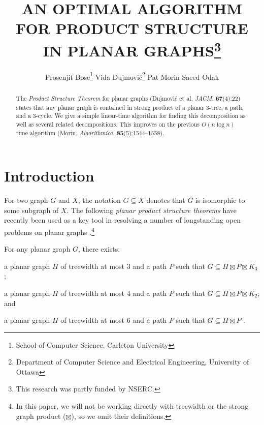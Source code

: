 \documentclass{patmorin}
\title{\MakeUppercase{An Optimal Algorithm for Product Structure in Planar Graphs}\thanks{This research was partly funded by NSERC.}}
\author{%
  Prosenjit Bose\thanks{School of Computer Science, Carleton University}\qquad
  Vida Dujmović\thanks{Department of Computer Science and Electrical Engineering, University of Ottawa}\qquad
  Pat Morin\footnotemark[1]\qquad
  Saeed Odak\footnotemark[2]}
\date{}
\begin{document}
\maketitle

\begin{abstract}
  The \emph{Product Structure Theorem} for planar graphs (Dujmović et al, \emph{JACM}, \textbf{67}(4):22) states that any planar graph is contained in strong product of a planar $3$-tree, a path, and a $3$-cycle.  We give a simple linear-time algorithm for finding this decomposition as well as several related decompositions.  This improves on the previous $O(n\log n)$ time algorithm (Morin, \emph{Algorithmica}, \textbf{85}(5):1544--1558).
\end{abstract}

%

\section{Introduction}

For two graph $G$ and $X$, the notation $G\subseteq X$ denotes that $G$ is isomorphic to some subgraph of $X$.
The following \emph{planar product structure theorems} have recently been used as a key tool in resolving a number of longstanding open problems on planar graphs \cite{dujmovic.esperet.ea:adjacency,dujmovic.joret.ea:planar,dujmovic.esperet.ea:planar,debski.felsner.ea:improved}.\footnote{In this paper, we will not be working directly with treewidth or the strong graph product ($\boxtimes$), so we omit their definitions.}


\begin{thm}\label{meta}
  For any planar graph $G$, there exists:
  \begin{compactenum}[(a)]
    \item \label{three_tree} a planar graph $H$ of treewidth at most $3$ and a path $P$ such that $G\subseteq H\boxtimes P\boxtimes K_3$ \cite{dujmovic.joret.ea:planar};
    \item \label{four_tree} a planar graph $H$ of treewidth at most $4$ and a path $P$ such that $G\subseteq H\boxtimes P\boxtimes K_2$; and
    \item \label{six_tree} a planar graph $H$ of treewidth at most $6$ and a path $P$ such that $G\subseteq H\boxtimes P$ \cite{ueckerdt.wood.ea:improved}.
  \end{compactenum}
\end{thm}
\end{document}
